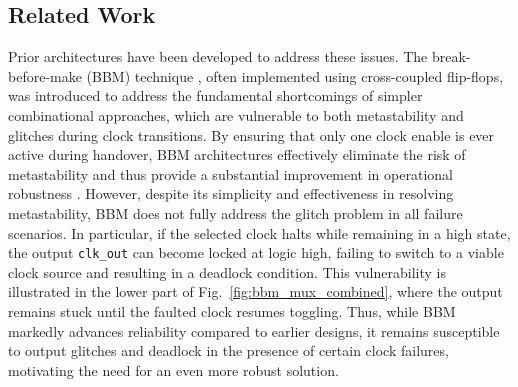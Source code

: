 \documentclass[conference]{IEEEtran}
\begin{document}
\subsection{Related Work}
\label{sec:related_work}

Prior architectures have been developed to address these issues. The break-before-make (BBM) technique \cite{harris2012digital}, often implemented using cross-coupled flip-flops, was introduced to address the fundamental shortcomings of simpler combinational approaches, which are vulnerable to both metastability and glitches during clock transitions. By ensuring that only one clock enable is ever active during handover, BBM architectures effectively eliminate the risk of metastability and thus provide a substantial improvement in operational robustness \cite{6142332}. However, despite its simplicity and effectiveness in resolving metastability, BBM does not fully address the glitch problem in all failure scenarios. In particular, if the selected clock halts while remaining in a high state, the output \texttt{clk\_out} can become locked at logic high, failing to switch to a viable clock source and resulting in a deadlock condition. This vulnerability is illustrated in the lower part of Fig.~\ref{fig:bbm_mux_combined}, where the output remains stuck until the faulted clock resumes toggling. Thus, while BBM markedly advances reliability compared to earlier designs, it remains susceptible to output glitches and deadlock in the presence of certain clock failures, motivating the need for an even more robust solution.
\end{document}
